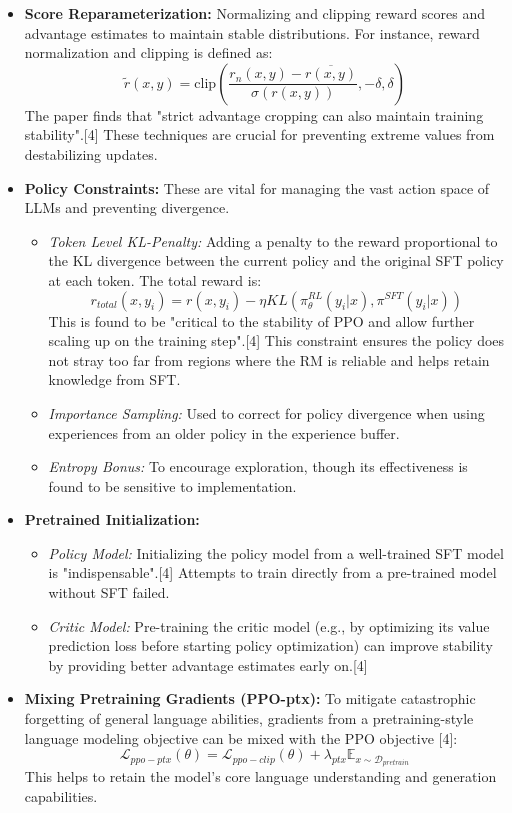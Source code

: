 \documentclass[10pt,journal,compsoc]{IEEEtran} %
\begin{document}
\begin{itemize}
    \item \textbf{Score Reparameterization:} Normalizing and clipping reward scores and advantage estimates to maintain stable distributions. For instance, reward normalization and clipping is defined as:
    $$ \tilde{r}(x,y)=\text{clip}\left(\frac{r_{n}(x,y)-\overline{r(x,y)}}{\sigma(r(x,y))},-\delta,\delta\right) $$
    The paper finds that "strict advantage cropping can also maintain training stability".[4] These techniques are crucial for preventing extreme values from destabilizing updates.
    \item \textbf{Policy Constraints:} These are vital for managing the vast action space of LLMs and preventing divergence.
        \begin{itemize}
            \item \textit{Token Level KL-Penalty:} Adding a penalty to the reward proportional to the KL divergence between the current policy and the original SFT policy at each token. The total reward is:
            $$ r_{total}(x,y_i) = r(x,y_i) - \eta KL(\pi_\theta^{RL}(y_i|x),\pi^{SFT}(y_i|x)) $$
            This is found to be "critical to the stability of PPO and allow further scaling up on the training step".[4] This constraint ensures the policy does not stray too far from regions where the RM is reliable and helps retain knowledge from SFT.
            \item \textit{Importance Sampling:} Used to correct for policy divergence when using experiences from an older policy in the experience buffer.
            \item \textit{Entropy Bonus:} To encourage exploration, though its effectiveness is found to be sensitive to implementation.
        \end{itemize}
    \item \textbf{Pretrained Initialization:}
        \begin{itemize}
            \item \textit{Policy Model:} Initializing the policy model from a well-trained SFT model is "indispensable".[4] Attempts to train directly from a pre-trained model without SFT failed.
            \item \textit{Critic Model:} Pre-training the critic model (e.g., by optimizing its value prediction loss before starting policy optimization) can improve stability by providing better advantage estimates early on.[4]
        \end{itemize}
    \item \textbf{Mixing Pretraining Gradients (PPO-ptx):} To mitigate catastrophic forgetting of general language abilities, gradients from a pretraining-style language modeling objective can be mixed with the PPO objective [4]:
    $$ \mathcal{L}_{ppo-ptx}(\theta)=\mathcal{L}_{ppo-clip}(\theta)+\lambda_{ptx}\mathbb{E}_{x\sim\mathcal{D}_{pretrain}} $$
    This helps to retain the model's core language understanding and generation capabilities.
\end{itemize}
\end{document}
